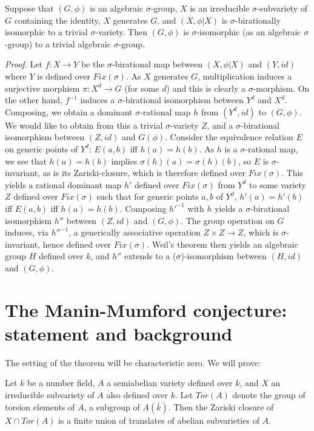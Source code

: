 \begin{Fact} Suppose that $(G,\phi)$ is an
algebraic $\sigma$-group, $X$ is an
irreducible $\sigma$-subvariety of $G$
containing the identity, $X$ generates $G$,
and $(X,\phi|X)$ is $\sigma$-birationally
isomorphic to a trivial $\sigma$-variety. Then
$(G,\phi)$ is $\sigma$-isomorphic (as an
algebraic $\sigma$-group) to a trivial
algebraic $\sigma$-group.
\end{Fact}
{\em Proof.} Let $f:X\rightarrow Y$ be the
$\sigma$-birational map between $(X,\phi|X)$
and $(Y,id)$ where $Y$ is defined over
$Fix(\sigma)$. As $X$ generates $G$,
multiplication induces a surjective morphism
$\pi:X^{d} \rightarrow G$ (for some $d$) and
this is clearly a $\sigma$-morphism. On the
other hand, $f^{-1}$ induces a
$\sigma$-birational isomorphism between
$Y^{d}$ and $X^{d}$. Composing, we obtain a
dominant $\sigma$-rational map $h$ from
$(Y^{d},id)$ to $(G,\phi)$. We would like to
obtain from this a trivial
$\sigma$-variety $Z$, and a
$\sigma$-birational isomorphism between
$(Z,id)$ and $G(\phi)$. Consider the
equivalence relation $E$ on generic points of
$Y^{d}$: $E(a,b)$ iff $h(a) = h(b)$. As $h$ is
a $\sigma$-rational map, we see that $h(a) =
h(b)$ implies $\sigma(h)(a) = \sigma(h)(b)$,
so $E$ is $\sigma$-invariant, as is its
Zariski-closure, which is therefore defined
over $Fix(\sigma)$. This yields a rational
dominant map $h'$ defined over $Fix(\sigma)$
from $Y^{d}$ to some variety $Z$ defined over
$Fix(\sigma)$ such that for generic points
$a,b$ of $Y^{d}$, $h'(a) = h'(b)$ iff $E(a,b)$
iff $h(a) = h(b)$. Composing $h'^{-1}$ with
$h$ yields a $\sigma$-birational isomorphism
$h''$ between $(Z,id)$ and $(G,\phi)$.
The group operation on $G$
induces, via $h''^{-1}$, a generically
associative operation $Z\times Z\rightarrow
Z$, which is $\sigma$-invariant, hence defined
over
$Fix(\sigma)$. Weil's theorem
then yields an algebraic group $H$ defined
over $k$, and $h''$ extends to a
($\sigma$)-isomorphism between
$(H,id)$ and $(G,\phi)$.


\section{The Manin-Mumford conjecture:
statement and background}
The setting of the
theorem will be characteristic zero. We will
prove:
\begin{Theorem} Let $k$ be a number field, $A$
a semiabelian variety defined over $k$, and
$X$ an irreducible subvariety of $A$ also
defined over $k$. Let $Tor(A)$ denote the
group of torsion elements of $A$, a subgroup
of $A({\bar k})$. Then the Zariski closure of
$X\cap Tor(A)$ is a finite union of translates
of abelian subvarieties of $A$.
\end{Theorem}

